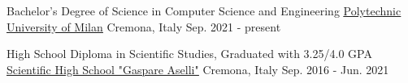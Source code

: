 

\begin{cventries}

  \cventry
    {Bachelor's Degree of Science in Computer Science and Engineering} %
    {\underline{\href{https://www.polimi.it/en/}{Polytechnic University of Milan}}} %
    {Cremona, Italy} %
    {Sep. 2021 - present} %
    {
    }

  \cventry
    {High School Diploma in Scientific Studies, Graduated with 3.25/4.0 GPA} %
    {\underline{\href{https://liceoaselli.edu.it/}{Scientific High School "Gaspare Aselli"}}} %
    {Cremona, Italy} %
    {Sep. 2016 - Jun. 2021} %
    {
    }

\end{cventries}
